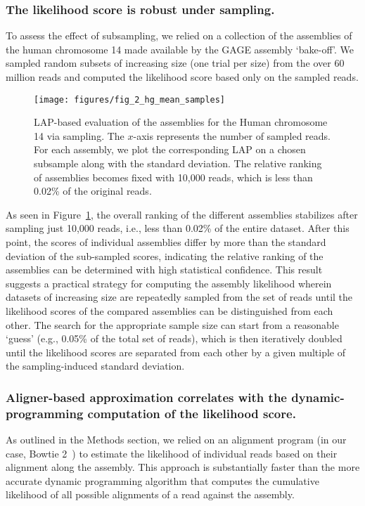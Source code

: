 \subsubsection{The likelihood score is robust under sampling.} To assess the
effect of subsampling, we relied on a collection of the assemblies of the
human chromosome 14 made available by the GAGE assembly `bake-off'.
We sampled random subsets of increasing size (one trial per
size) from the over 60 million reads and
computed the likelihood score based only on the sampled reads.

\begin{figure}[h!]
\begin{center}
\texttt{[image: figures/fig\_2\_hg\_mean\_samples]}
\end{center}
\renewcommand{\baselinestretch}{1}
\small\normalsize
\begin{quote}
\caption[LAP-based evaluation of the assemblies for the Human
  chromosome 14 via sampling.]{LAP-based evaluation of the assemblies for the Human
    chromosome 14 via sampling.
  The $x$-axis represents the number of
  sampled reads.  For each assembly, we plot the corresponding LAP
  on a chosen subsample along with the standard deviation.  The relative
  ranking of assemblies becomes fixed with 10,000 reads, which is
  less than 0.02\% of the original reads.}
\label{hg_mean_samples}
\end{quote}
\end{figure}
\renewcommand{\baselinestretch}{2}
\small\normalsize

As seen in Figure~\ref{hg_mean_samples}, the overall ranking of the
different assemblies stabilizes after sampling just
10,000 reads, i.e., less than 0.02\% of the entire dataset. After
this point, the scores of individual assemblies differ by more than
the standard deviation of the sub-sampled scores, indicating the relative
ranking of the assemblies can be determined with high statistical
confidence. This result suggests a practical strategy for computing
the assembly likelihood wherein datasets of increasing size are
repeatedly sampled from the set of reads until the likelihood scores
of the compared assemblies can be distinguished from each
other. The search for the appropriate sample size can start from a
reasonable `guess' (e.g., 0.05\% of the total set of reads), which is
then iteratively doubled until the likelihood scores are separated from
each other by a given multiple of the sampling-induced standard deviation.

\subsubsection{Aligner-based approximation correlates with the
  dynamic-programming computation of the likelihood score.} As outlined in
the Methods section, we relied on an alignment program (in our case,
Bowtie 2~\cite{langmead2012fast}) to estimate the likelihood of individual reads
based on their alignment along the assembly.  This approach is
substantially faster than the more accurate dynamic programming
algorithm that computes the cumulative likelihood of all possible
alignments of a read against the assembly.

